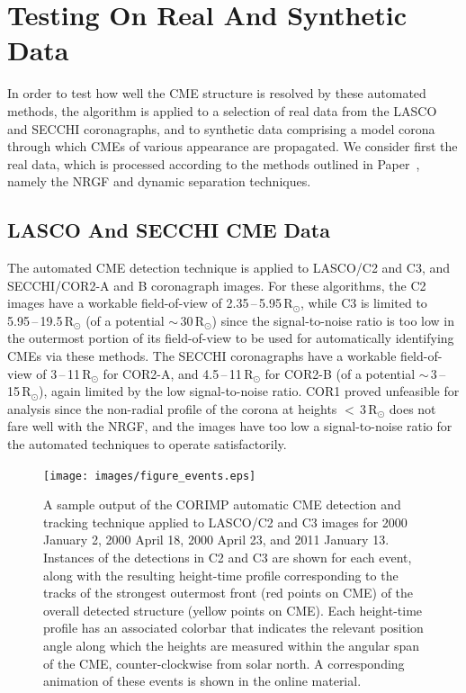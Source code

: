 \documentclass[preprint2]{aastex}
\newcommand{\RNum}[1]{\uppercase\expandafter{\romannumeral #1\relax}}
\begin{document}
\section{Testing On Real And Synthetic Data}
\label{sect_data}

In order to test how well the CME structure is resolved by these automated methods, the algorithm is applied to a selection of real data from the LASCO and SECCHI coronagraphs, and to synthetic data comprising a model corona through which CMEs of various appearance are propagated. We consider first the real data, which is processed according to the methods outlined in Paper~\RNum{1}, namely the NRGF and dynamic separation techniques.


\subsection{LASCO And SECCHI CME Data}
\label{subsect_data}

The automated CME detection technique is applied to LASCO/C2 and C3, and SECCHI/COR2-A and B coronagraph images. For these algorithms, the C2 images have a workable field-of-view of 2.35\,--\,5.95\,R$_{\odot}$, while C3 is limited to 5.95\,--\,19.5\,R$_{\odot}$  (of a potential $\sim$\,30\,R$_{\odot}$) since the signal-to-noise ratio is too low in the outermost portion of its field-of-view to be used for automatically identifying CMEs via these methods. The SECCHI coronagraphs have a workable field-of-view of 3\,--\,11\,R$_{\odot}$ for COR2-A, and 4.5\,--\,11\,R$_{\odot}$ for COR2-B (of a potential $\sim$\,3\,--\,15\,R$_{\odot}$), again limited by the low signal-to-noise ratio. COR1 proved unfeasible for analysis since the non-radial profile of the corona at heights $<$\,3\,R$_\odot$ does not fare well with the NRGF, and the images have too low a signal-to-noise ratio for the automated techniques to operate satisfactorily.

\begin{figure}[!p]
\centerline{\texttt{[image: images/figure\_events.eps]}}
\caption{A sample output of the CORIMP automatic CME detection and tracking technique applied to LASCO/C2 and C3 images for 2000 January 2, 2000 April 18, 2000 April 23, and 2011 January 13. Instances of the detections in C2 and C3 are shown for each event, along with the resulting height-time profile corresponding to the tracks of the strongest outermost front (red points on CME) of the overall detected structure (yellow points on CME). Each height-time profile has an associated colorbar that indicates the relevant position angle along which the heights are measured within the angular span of the CME, counter-clockwise from solar north. A corresponding animation of these events is shown in the online material.}
\label{figure_events}
\end{figure}
\end{document}
